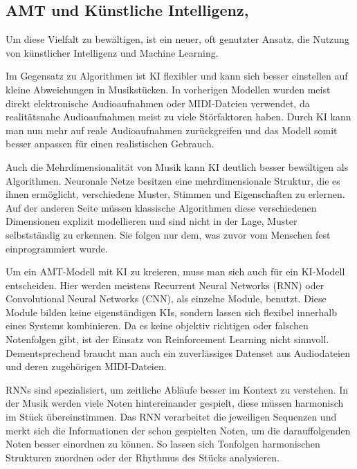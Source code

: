 \subsection{AMT und Künstliche Intelligenz,}
Um diese Vielfalt zu bewältigen, ist ein neuer, oft genutzter Ansatz,
die Nutzung von künstlicher Intelligenz und Machine Learning.

Im Gegensatz zu Algorithmen ist KI flexibler und kann sich besser
einstellen auf kleine Abweichungen in Musikstücken.
In vorherigen Modellen wurden meist direkt elektronische
Audioaufnahmen oder MIDI-Dateien verwendet, da realitätsnahe Audioaufnahmen
meist zu viele Störfaktoren haben.         %
Durch KI kann man nun mehr auf reale Audioaufnahmen zurückgreifen
und das Modell somit besser anpassen für einen realistischen Gebrauch.

Auch die Mehrdimensionalität von Musik kann KI deutlich besser bewältigen als Algorithmen.
Neuronale Netze besitzen eine mehrdimensionale Struktur, die es ihnen ermöglicht,
verschiedene Muster, Stimmen und Eigenschaften zu erlernen.    %
Auf der anderen Seite müssen klassische Algorithmen diese verschiedenen Dimensionen
explizit modellieren und sind nicht in der Lage, Muster selbstständig zu erkennen.
Sie folgen nur dem, was zuvor vom Menschen fest einprogrammiert wurde.

Um ein AMT-Modell mit KI zu kreieren, muss man sich auch für ein KI-Modell entscheiden.
Hier werden meistens Recurrent Neural Networks (RNN) oder Convolutional Neural Networks (CNN),
als einzelne Module, benutzt.
\cite{Boeck2012}
Diese Module bilden keine eigenständigen KIs, sondern lassen sich flexibel innerhalb eines Systems kombinieren.
Da es keine objektiv richtigen oder falschen Notenfolgen gibt, ist der Einsatz von Reinforcement Learning nicht sinnvoll.
Dementsprechend braucht man auch ein zuverlässiges Datenset aus Audiodateien und deren zugehörigen MIDI-Dateien.

RNNs sind spezialisiert, um zeitliche Abläufe besser im Kontext zu verstehen.
In der Musik werden viele Noten hintereinander gespielt, diese müssen harmonisch im Stück übereinstimmen.
Das RNN verarbeitet die jeweiligen Sequenzen und merkt sich die Informationen der schon gespielten Noten,
um die darauffolgenden Noten besser einordnen zu können.
So lassen sich Tonfolgen harmonischen Strukturen zuordnen oder der Rhythmus des Stücks analysieren.
\cite{Boeck2012}

